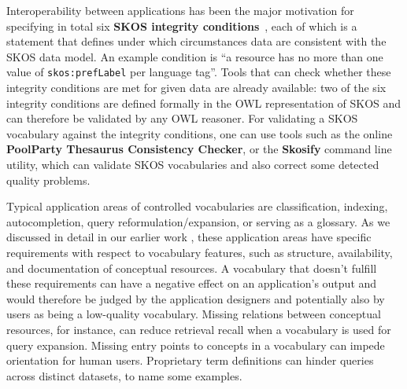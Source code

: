


Interoperability between applications has been the major motivation for specifying in total six \textbf{SKOS integrity conditions}~\cite{Miles2005}, each of which is a statement that defines under which circumstances data are consistent with the SKOS data model. An example condition is ``a resource has no more than one value of \texttt{skos:prefLabel} per language tag''. Tools that can check whether these integrity conditions are met for given data are already available: two of the six integrity conditions are defined formally in the OWL representation of SKOS and can therefore be validated by any OWL reasoner. For validating a SKOS vocabulary against the integrity conditions, one can use tools such as the online \textbf{PoolParty Thesaurus Consistency Checker}, or the \textbf{Skosify} command line utility, which can validate SKOS vocabularies and also correct some detected quality problems.


Typical application areas of controlled vocabularies are classification, indexing, autocompletion, query reformulation/expansion, or serving as a glossary. As we discussed in detail in our earlier work \cite{Nagy2011}, these application areas have specific requirements with respect to vocabulary features, such as structure, availability, and documentation of conceptual resources. A vocabulary that doesn't fulfill these requirements can have a negative effect on an application's output and would therefore be judged by the application designers and potentially also by users as being a low-quality vocabulary. Missing relations between conceptual resources, for instance, can reduce retrieval recall when a vocabulary is used for query expansion. Missing entry points to concepts in a vocabulary can impede orientation for human users. Proprietary term definitions can hinder queries across distinct datasets, to name some examples.


